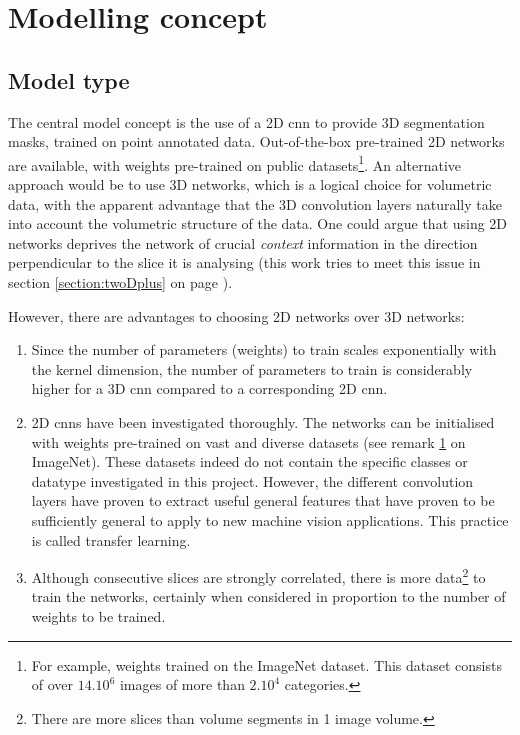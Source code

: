 \section{Modelling concept\label{sec:model_concept}}

\subsection{Model type}
\par{
    The central model concept is the use of a 2D \acrfull{cnn} to provide 3D segmentation masks, trained on point annotated data.
    Out-of-the-box pre-trained 2D networks are available, with weights pre-trained on public datasets\footnote{\label{footnote:Imagenet}For example, weights trained on the ImageNet dataset. 
    This dataset consists of over $14.10^6$ images of more than $2.10^4$ categories.}.
    An alternative approach would be to use 3D networks, which is a logical choice for volumetric data, with the apparent advantage that the 3D convolution layers naturally take into account the volumetric structure of the data.
    One could argue that using 2D networks deprives the network of crucial \textit{context} information in the direction perpendicular to the slice it is analysing (this work tries to meet this issue in section \ref{section:twoDplus} on page \pageref{section:twoDplus}).     
}

However, there are advantages to choosing 2D networks over 3D networks:
\begin{enumerate}
    \item Since the number of parameters (weights) to train scales exponentially with the kernel dimension, the number of parameters to train is considerably higher for a 3D \acrshort{cnn} compared to a corresponding 2D \acrshort{cnn}.
    \item 2D \acrlong{cnn}s have been investigated thoroughly. The networks can be initialised with weights pre-trained on vast and diverse datasets (see remark \ref{footnote:Imagenet} on ImageNet). 
    These datasets indeed do not contain the specific classes or datatype investigated in this project. 
    However, the different convolution layers have proven to extract useful general features that have proven to be sufficiently general to apply to new machine vision applications. This practice is called transfer learning.
    \item Although consecutive slices are strongly correlated, there is more data\footnote{There are more slices than volume segments in 1 image volume.} to train the networks, certainly when considered in proportion to the number of weights to be trained.
\end{enumerate}

